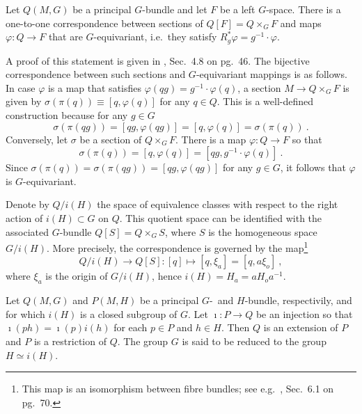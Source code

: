 \documentclass[11pt]{article}
\begin{document}
\begin{proposition}\label{prop:corr_section_map}
	Let $Q(M,G)$ be a principal $G$-bundle and let $F$ be a left 
	$G$-space. There is a one-to-one correspondence between 
	sections of $Q[F] = Q \times_G F$ and maps $\varphi : Q \to F$ 
	that are $G$-equivariant, i.e.~they satisfy $R^\ast_g\varphi = 
	g^{-1}\cdot\varphi$.
\end{proposition}

\begin{remark}
A proof of this statement is given in 
\cite{husemoller:1966fibre}, Sec.~4.8 on pg.~46. The bijective
correspondence between such sections and $G$-equivariant mappings 
is as follows. In case $\varphi$ is a map that satisfies 
$\varphi(qg) = g^{-1}\cdot\varphi(q)$, a section $M \to Q 
\times_G F$ is given by $\sigma(\pi(q)) \equiv [q, \varphi(q)]$ 
for any $q \in Q$.  This is a well-defined construction because 
for any $g \in G$
\begin{displaymath}
	\sigma(\pi(qg)) = [qg,\varphi(qg)] = [q,\varphi(q)] = 
	\sigma(\pi(q))~.
\end{displaymath}
Conversely, let $\sigma$ be a section of $Q \times_G F$. There is 
a map $\varphi : Q \to F$ so that
\begin{displaymath}
	\sigma(\pi(q)) = [q,\varphi(q)] = [qg,g^{-1}\cdot\varphi(q)]~.
\end{displaymath}
Since $\sigma(\pi(q)) = \sigma(\pi(qg)) = [qg,\varphi(qg)]$ for 
any $g \in G$, it follows that $\varphi$ is $G$-equivariant.
\end{remark}

Denote by $Q/i(H)$ the space of equivalence classes with respect 
to the right action of $i(H) \subset G$ on $Q$. This quotient 
space can be identified with the associated $G$-bundle $Q[S] = Q 
\times_G S$, where $S$ is the homogeneous space $G/i(H)$. More 
precisely, the correspondence is governed by the 
map\footnote{This map is an isomorphism between fibre bundles; 
	see e.g.~\cite{husemoller:1966fibre}, Sec.~6.1 on pg.~70.}
\begin{displaymath}
	Q/i(H) \to Q[S] : [q] \mapsto [q,\xi_a] = [q,a\xi_o]~,
\end{displaymath}
where $\xi_a$ is the origin of $G/i(H)$, hence $i(H) = H_a = 
aH_oa^{-1}$.  

\begin{definition}
	Let $Q(M,G)$ and $P(M,H)$ be a principal $G$-~and $H$-bundle, 
	respectivily, and for which $i(H)$ is a closed subgroup of 
	$G$. Let $\imath : P \to Q$ be an injection so that 
	$\imath(ph) = \imath(p)i(h)$ for each $p \in P$ and $h \in H$.  
	Then $Q$ is an extension of $P$ and $P$ is a restriction of 
	$Q$. The group $G$ is said to be reduced to the group $H 
	\simeq i(H)$.
\end{definition}
\end{document}
